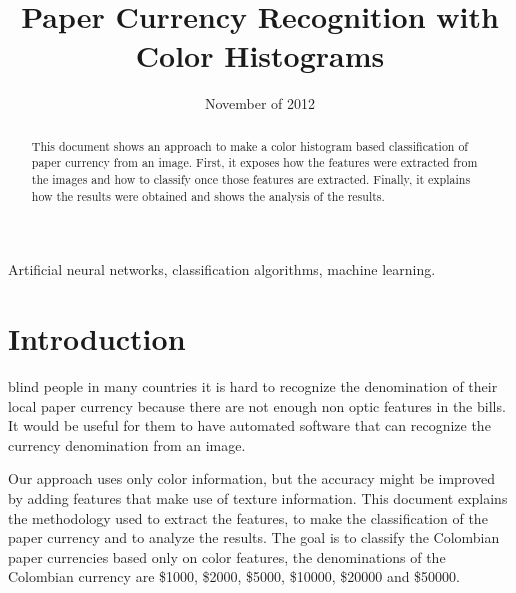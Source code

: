 \documentclass{IEEEtran}
\begin{document}
\title{Paper Currency Recognition with Color Histograms}
\date {November of 2012}
\author{
}
\maketitle


\begin{abstract}
This document shows an approach to make a color histogram based classification of paper currency from an image.
First, it exposes how the features were extracted from the images and how to classify once those features
are extracted. Finally, it explains how the results were obtained and shows the analysis of the results.
\end{abstract}

\begin{IEEEkeywords}
Artificial neural networks, classification algorithms, machine learning.
\end{IEEEkeywords}

\section{Introduction}
 blind people in many countries it is hard to recognize the denomination of their local paper currency because
there are not enough non optic features in the bills. It would be useful for them to have automated software that
can recognize the currency denomination from an image.


Our approach uses only color information, but the accuracy might be improved by adding features that make use of
texture information. This document explains the methodology used to extract the features, to make the classification
of the paper currency and to analyze the results. The goal is to classify the Colombian paper currencies based only
on color features, the denominations of the Colombian currency are \$1000, \$2000, \$5000, \$10000, \$20000 and
\$50000.
\end{document}
